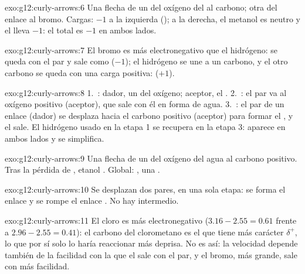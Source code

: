 \begin{solution}{exo:g12:curly-arrows:6}
Una flecha de un  del oxígeno del  al carbono; otra del
enlace  al bromo. Cargas: $-1$ a la izquierda (); a la
derecha, el metanol es neutro y el  lleva $-1$: el total es $-1$
en ambos lados.
\end{solution}

\begin{solution}{exo:g12:curly-arrows:7}
El bromo es más electronegativo que el hidrógeno: se queda con el par y
sale como  ($-1$); el hidrógeno se une a un carbono, y el otro
carbono se queda con una carga positiva:  ($+1$).
\end{solution}

\begin{solution}{exo:g12:curly-arrows:8}
1.~: dador, un  del
oxígeno; aceptor, el . 2.~: el
par  va al oxígeno positivo (aceptor), que sale con él en forma
de agua. 3.~: el par de un enlace 
(dador) se desplaza hacia el carbono positivo (aceptor) para formar el
, y el  sale. El  hidrógeno usado en la etapa 1 se
recupera en la etapa 3: aparece en ambos lados y se simplifica.
\end{solution}

\begin{solution}{exo:g12:curly-arrows:9}
Una flecha de un  del oxígeno del agua al carbono positivo. Tras
la pérdida de , etanol . Global:
, una .
\end{solution}

\begin{solution}{exo:g12:curly-arrows:10}
Se desplazan dos pares, en una sola etapa: se forma el enlace  y
se rompe el enlace . No hay intermedio.
\end{solution}

\begin{solution}{exo:g12:curly-arrows:11}
El cloro es más electronegativo ($3.16 - 2.55 = 0.61$ frente a
$2.96 - 2.55 = 0.41$): el carbono del clorometano es el que tiene más
carácter $\delta^+$, lo que por sí solo lo haría reaccionar más deprisa.
No es así: la velocidad depende también de la facilidad con la que el
 sale con el par, y el bromo, más grande, sale con más facilidad.
\end{solution}

